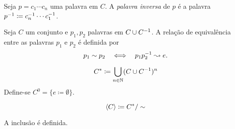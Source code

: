 Seja $p=c_1 \cdots c_n$ uma palavra em $C$. A \emph{palavra inversa} de $p$ é a palavra $p\inv \coloneqq c_n\inv \cdots c_1\inv$.

\begin{defi}
Seja $C$ um conjunto e $p_1,p_2 $ palavras em $C \cup C^{-1}$. A relação de equivalência entre as palavras $p_1$ e $p_2$ é definida por
	\begin{equation*}
	p_1 \sim p_2 \quad \Longleftrightarrow \quad p_1p_2^{-1} \leadsto e.
	\end{equation*}	
\end{defi}

	\begin{equation*}
	C^* \coloneqq \bigcup_{n \in \N} (C \cup C\inv)^n
	\end{equation*}
 Define-se $C^0 = \{e\coloneqq \emptyset\}$.

	\begin{equation*}
	\ger{C} \coloneqq C^*/\sim
	\end{equation*}
	
	A inclusão é definida.

